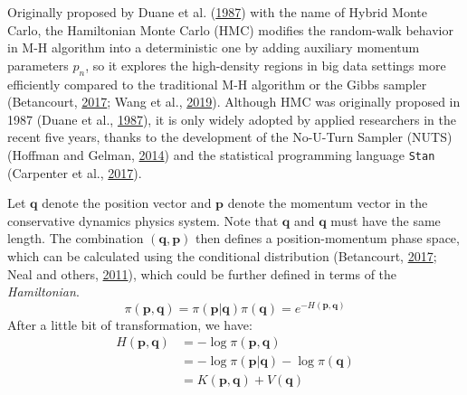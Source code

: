 \documentclass[12pt]{book}
\numberwithin{equation}{chapter}
\begin{document}
Originally proposed by Duane et al. (\protect\hyperlink{ref-duane1987hybrid}{1987}) with the name of Hybrid Monte Carlo, the Hamiltonian Monte Carlo (HMC) modifies the random-walk behavior in M-H algorithm into a deterministic one by adding auxiliary momentum parameters \(p_n\), so it explores the high-density regions in big data settings more efficiently compared to the traditional M-H algorithm or the Gibbs sampler (Betancourt, \protect\hyperlink{ref-betancourt2017conceptual}{2017}; Wang et al., \protect\hyperlink{ref-wang2019hamiltonian}{2019}). Although HMC was originally proposed in 1987 (Duane et al., \protect\hyperlink{ref-duane1987hybrid}{1987}), it is only widely adopted by applied researchers in the recent five years, thanks to the development of the No-U-Turn Sampler (NUTS) (Hoffman and Gelman, \protect\hyperlink{ref-hoffman2014no}{2014}) and the statistical programming language \texttt{Stan} (Carpenter et al., \protect\hyperlink{ref-carpenter2017stan}{2017}).

Let \(\boldsymbol{q}\) denote the position vector and \(\boldsymbol{p}\) denote the momentum vector in the conservative dynamics physics system. Note that \(\boldsymbol{q}\) and \(\boldsymbol{q}\) must have the same length. The combination \((\boldsymbol{q}, \boldsymbol{p})\) then defines a position-momentum phase space, which can be calculated using the conditional distribution (Betancourt, \protect\hyperlink{ref-betancourt2017conceptual}{2017}; Neal and others, \protect\hyperlink{ref-neal2011mcmc}{2011}), which could be further defined in terms of the \emph{Hamiltonian}.
\[\pi(\boldsymbol{p}, \boldsymbol{q}) = \pi(\boldsymbol{p}|\boldsymbol{q})\pi(\boldsymbol{q}) = e^{-H(\boldsymbol{p}, \boldsymbol{q})}\]
After a little bit of transformation, we have:
\begin{equation}
\begin{aligned}
H(\boldsymbol{p}, \boldsymbol{q}) &= -\log \pi(\boldsymbol{p}, \boldsymbol{q})\\
&= -\log\pi(\boldsymbol{p}|\boldsymbol{q}) - \log\pi(\boldsymbol{q})\\
&= K(\boldsymbol{p}, \boldsymbol{q}) + V(\boldsymbol{q})
\label{eq:hamiltonian}
\end{aligned}
\end{equation}
\end{document}

